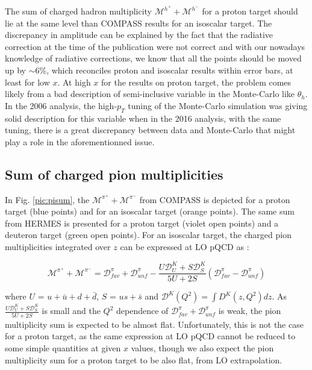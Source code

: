 The sum of charged hadron multiplicity $\mathscr{M}^{h^+}+\mathscr{M}^{h^-}$ for a proton target should lie at the same level than COMPASS results for an isoscalar target. The discrepancy in amplitude can be explained by the fact that the radiative correction at the time of the publication were not correct and with our nowadays knowledge of radiative corrections, we know that all the points should be moved up by $\sim$6\%, which reconciles proton and isoscalar results within error bars, at least for low $x$. At high $x$ for the results on proton target, the problem comes likely from a bad description of semi-inclusive variable in the Monte-Carlo like $\theta_h$. In the 2006 analysis, the high-$p_T$ tuning of the Monte-Carlo simulation was giving solid description for this variable when in the 2016 analysis, with the same tuning, there is a great discrepancy between data and Monte-Carlo that might play a role in the aforementionned issue.

\subsection{Sum of charged pion multiplicities}

In Fig. \ref{pic:pisum}, the $\mathscr{M}^{\pi^+}+\mathscr{M}^{\pi^-}$ from COMPASS is depicted for a proton target (blue points) and for an isoscalar target (orange points). The same sum from HERMES is presented for a proton target (violet open points) and a deuteron target (green open points). For an isoscalar target, the charged pion multiplicities integrated over $z$ can be expressed at LO pQCD as :

\begin{equation}
  \mathscr{M^{\pi^+}}+\mathscr{M^{\pi^-}} = \mathscr{D}^{\pi}_{fav} + \mathscr{D}^{\pi}_{unf} - \frac{U\mathscr{D}^K_U+S\mathscr{D}^K_S}{5U+2S} \left( \mathscr{D}^{\pi}_{fav} - \mathscr{D}^{\pi}_{unf} \right)
\end{equation}

where $U$ = $u+\bar{u}+d+\bar{d}$, $S$ = $us+\bar{s}$ and $\mathscr{D}^K(Q^2) = \int D^K(z,Q^2) dz $. As $\frac{U\mathscr{D}^K_U+S\mathscr{D}^K_S}{5U+2S}$ is small and the $Q^2$ dependence of $\mathscr{D}^{\pi}_{fav} + \mathscr{D}^{\pi}_{unf}$ is weak, the pion multiplicity sum is expected to be almost flat. Unfortunately, this is not the case for a proton target, as the same expression at LO pQCD cannot be reduced to some simple quantities at given $x$ values, though we also expect the pion multiplicity sum for a proton target to be also flat, from LO extrapolation.

